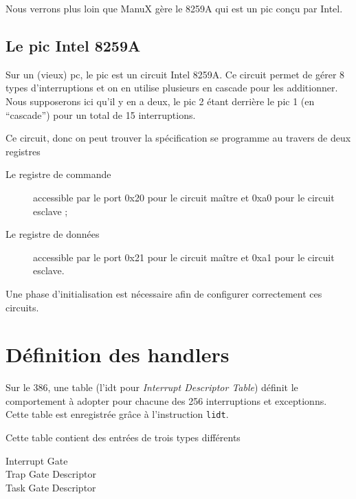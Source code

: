 \begin{itemize}
   Nous verrons plus loin que ManuX gère le 8259A qui est un {\sc pic}
conçu par Intel.

%
\subsection{Le {\sc pic} Intel 8259A}

   Sur un (vieux) {\sc pc}, le {\sc pic} est un circuit Intel 8259A. Ce
circuit permet de gérer 8 types d'interruptions et on en utilise
plusieurs en cascade pour les additionner. Nous supposerons ici qu'il
y en a deux, le {\sc pic} 2 étant derrière le {\sc pic} 1 (en
``cascade'') pour un total de 15 interruptions.

   Ce circuit, donc on peut trouver la spécification
\cite{intel-8259a-spec} se programme au travers de deux registres

\begin{description}
    \item[Le registre de commande] accessible par le port 0x20 pour le
      circuit maître et 0xa0 pour le circuit esclave ;
    \item[Le registre de données] accessible par le port 0x21 pour le
      circuit maître et 0xa1 pour le circuit esclave.
\end{description}

   Une phase d'initialisation est nécessaire afin de configurer
correctement ces circuits.
   
   
%      
\section{Définition des handlers}

   Sur le 386, une table (l'{\sc idt} pour {\em Interrupt Descriptor Table})
définit le comportement à adopter pour chacune des 256 interruptions
et exceptionns. Cette table est enregistrée grâce à l'instruction
\lstinline!lidt!.

   Cette table contient des entrées de trois types différents

\begin{description}
   \item[Interrupt Gate]       
   \item[Trap Gate Descriptor]       
   \item[Task Gate Descriptor]       
\end{description}


\end{itemize}
